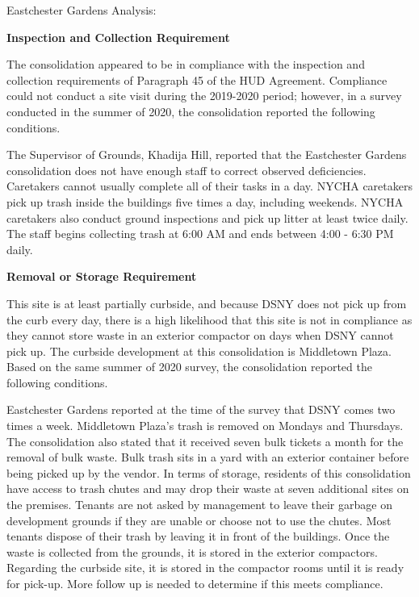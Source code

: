 Eastchester Gardens Analysis: 

\textbf{Inspection and Collection Requirement} 

 

The consolidation appeared to be in compliance with the inspection and collection requirements of Paragraph 45 of the HUD Agreement. Compliance could not conduct a site visit during the 2019-2020 period; however, in a survey conducted in the summer of 2020, the consolidation reported the following conditions.

The Supervisor of Grounds, Khadija Hill, reported that the Eastchester Gardens consolidation does not have enough staff to correct observed deficiencies. Caretakers cannot usually complete all of their tasks in a day. NYCHA caretakers pick up trash inside the buildings five times a day, including weekends. NYCHA caretakers also conduct ground inspections and pick up litter at least twice daily. The staff begins collecting trash at 6:00 AM and ends between 4:00  - 6:30 PM daily.

\textbf{Removal or Storage Requirement} 

  

This site is at least partially curbside, and because DSNY does not pick up from the curb every day, there is a high likelihood that this site is not in compliance as they cannot store waste in an exterior compactor on days when DSNY cannot pick up. The curbside development at this consolidation is Middletown Plaza. Based on the same summer of  2020 survey, the consolidation reported the following conditions.

 

Eastchester Gardens reported at the time of the survey that DSNY comes two times a week. Middletown Plaza's trash is removed on Mondays and Thursdays. The consolidation also stated that it received seven bulk tickets a month for the removal of bulk waste. Bulk trash sits in a yard with an exterior container before being picked up by the vendor. In terms of storage, residents of this consolidation have access to trash chutes and may drop their waste at seven additional sites on the premises. Tenants are not asked by management to leave their garbage on development grounds if they are unable or choose not to use the chutes. Most tenants dispose of their trash by leaving it in front of the buildings. Once the waste is collected from the grounds, it is stored in the exterior compactors. Regarding the curbside site, it is stored in the compactor rooms until it is ready for pick-up. More follow up is needed to determine if this meets compliance.


